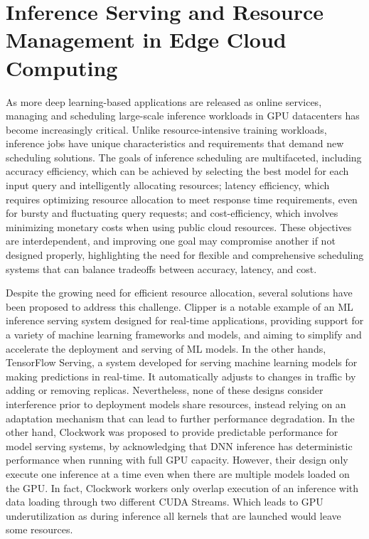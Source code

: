 
\section{Inference Serving and Resource Management in Edge Cloud Computing}

As more deep learning-based applications are released as online services, managing and scheduling large-scale inference workloads in GPU datacenters has become increasingly critical. Unlike resource-intensive training workloads, inference jobs have unique characteristics and requirements that demand new scheduling solutions. The goals of inference scheduling are multifaceted, including accuracy efficiency, which can be achieved by selecting the best model for each input query and intelligently allocating resources; latency efficiency, which requires optimizing resource allocation to meet response time requirements, even for bursty and fluctuating query requests; and cost-efficiency, which involves minimizing monetary costs when using public cloud resources. These objectives are interdependent, and improving one goal may compromise another if not designed properly, highlighting the need for flexible and comprehensive scheduling systems that can balance tradeoffs between accuracy, latency, and cost.

Despite the growing need for efficient resource allocation, several solutions have been proposed to address this challenge. Clipper is a notable example of an ML inference serving system designed for real-time applications, providing support for a variety of machine learning frameworks and models, and aiming to simplify and accelerate the deployment and serving of ML models. In the other hands, TensorFlow Serving, a system developed for serving machine learning models for making predictions in real-time. It automatically adjusts to changes in traffic by adding or removing replicas. Nevertheless, none of these designs consider interference prior to deployment models share resources, instead relying on an adaptation mechanism that can lead to further performance degradation. In the other hand, Clockwork was proposed to provide predictable performance for model serving systems, by acknowledging that DNN inference has deterministic performance when running with full GPU capacity. However, their design only execute one inference at a time even when there are multiple models loaded on the GPU. In fact, Clockwork workers only overlap execution of an inference with data loading through two different CUDA Streams. Which leads to GPU underutilization as during inference all kernels that are launched would leave some resources.

